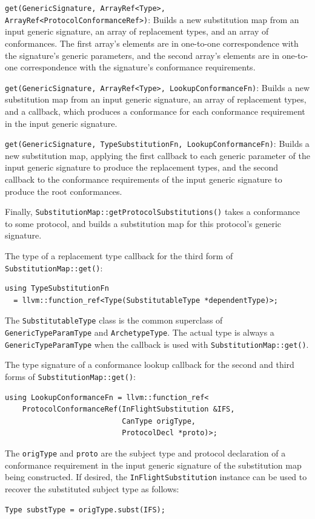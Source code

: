 \documentclass[../generics]{subfiles}
\begin{document}
\medskip
\noindent
\texttt{get(GenericSignature, ArrayRef<Type>, ArrayRef<ProtocolConformanceRef>)}:\newline
Builds a new substitution map from an input generic signature, an array of replacement types, and an array of conformances. The first array's elements are in one-to-one correspondence with the signature's generic parameters, and the second array's elements are in one-to-one correspondence with the signature's conformance requirements.

\medskip
\noindent
\texttt{get(GenericSignature, ArrayRef<Type>, LookupConformanceFn)}:\newline
Builds a new substitution map from an input generic signature, an array of replacement types, and a callback, which produces a conformance for each conformance requirement in the input generic signature.

\medskip
\noindent
\texttt{get(GenericSignature, TypeSubstitutionFn, LookupConformanceFn)}:\newline
Builds a new substitution map, applying the first callback to each generic parameter of the input generic signature to produce the replacement types, and the second callback to the conformance requirements of the input generic signature to produce the root conformances.

\medskip

Finally, \texttt{SubstitutionMap::getProtocolSubstitutions()} takes a conformance to some protocol, and builds a substitution map for this protocol's generic signature.

The type of a replacement type callback for the third form of \texttt{SubstitutionMap::get()}:
\begin{verbatim}
using TypeSubstitutionFn
  = llvm::function_ref<Type(SubstitutableType *dependentType)>;
\end{verbatim}
The \texttt{SubstitutableType} class is the common superclass of \texttt{GenericTypeParamType} and \texttt{ArchetypeType}. The actual type is always a \texttt{GenericTypeParamType} when the callback is used with \texttt{SubstitutionMap::get()}.

The type signature of a conformance lookup callback for the second and third forms of \texttt{SubstitutionMap::get()}:
\begin{verbatim}
using LookupConformanceFn = llvm::function_ref<
    ProtocolConformanceRef(InFlightSubstitution &IFS,
                           CanType origType,
                           ProtocolDecl *proto)>;
\end{verbatim}
The \texttt{origType} and \texttt{proto} are the subject type and protocol declaration of a conformance requirement in the input generic signature of the substitution map being constructed. If desired, the \texttt{InFlightSubstitution} instance can be used to recover the substituted subject type as follows:
\begin{Verbatim}
Type substType = origType.subst(IFS);
\end{Verbatim}
\end{document}
